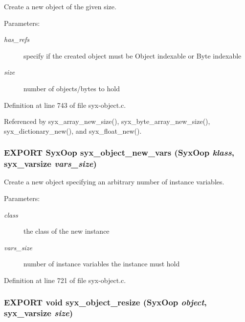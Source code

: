 Create a new object of the given size.

\begin{Desc}
\item[Parameters:]
\begin{description}
\item[{\em has\_\-refs}]specify if the created object must be Object indexable or Byte indexable \item[{\em size}]number of objects/bytes to hold \end{description}
\end{Desc}


Definition at line 743 of file syx-object.c.

Referenced by syx\_\-array\_\-new\_\-size(), syx\_\-byte\_\-array\_\-new\_\-size(), syx\_\-dictionary\_\-new(), and syx\_\-float\_\-new().\hypertarget{syx-object_8h_2ad72ae9f822633bd80b9960fb758961}{
\subsubsection{\setlength{\rightskip}{0pt plus 5cm}EXPORT {\bf SyxOop} syx\_\-object\_\-new\_\-vars ({\bf SyxOop} {\em klass}, \/  {\bf syx\_\-varsize} {\em vars\_\-size})}}
\label{syx-object_8h_2ad72ae9f822633bd80b9960fb758961}


Create a new object specifying an arbitrary number of instance variables.

\begin{Desc}
\item[Parameters:]
\begin{description}
\item[{\em class}]the class of the new instance \item[{\em vars\_\-size}]number of instance variables the instance must hold \end{description}
\end{Desc}


Definition at line 721 of file syx-object.c.\hypertarget{syx-object_8h_8f1d632f929b4115e53dc9227ecac36b}{
\subsubsection{\setlength{\rightskip}{0pt plus 5cm}EXPORT void syx\_\-object\_\-resize ({\bf SyxOop} {\em object}, \/  {\bf syx\_\-varsize} {\em size})}}
\label{syx-object_8h_8f1d632f929b4115e53dc9227ecac36b}


